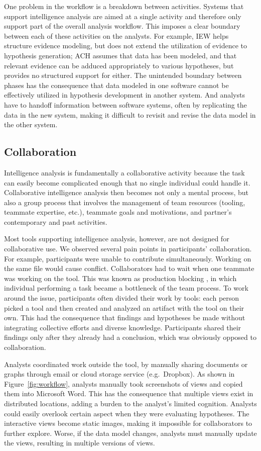 One problem in the workflow is a breakdown between activities. Systems that support intelligence analysis are aimed at a single activity and therefore only support part of the overall analysis workflow. This imposes a clear boundary between each of these activities on the analysts. For example, IEW helps structure evidence modeling, but does not extend the utilization of evidence to hypothesis generation; ACH assumes that data has been modeled, and that relevant evidence can be adduced appropriately to various hypotheses, but provides no structured support for either. The unintended boundary between phases has the consequence that data modeled in one software cannot be effectively utilized in hypothesis development in another system. And analysts have to handoff information between software systems, often by replicating the data in the new system, making it difficult to revisit and revise the data model in the other system.


\subsection{Collaboration}

Intelligence analysis is fundamentally a collaborative activity because the task can easily become complicated enough that no single individual could handle it. Collaborative intelligence analysis then becomes not only a mental process, but also a group process that involves the management of team resources (tooling, teammate expertise, etc.), teammate goals and motivations, and partner's contemporary and past activities.

Most tools supporting intelligence analysis, however, are not designed for collaborative use. We observed several pain points in participants’ collaboration. For example, participants were unable to contribute simultaneously. Working on the same file would cause conflict. Collaborators had to wait when one teammate was working on the tool. This was known as production blocking \citep{Diehl1987a}, in which individual performing a task became a bottleneck of the team process. To work around the issue, participants often divided their work by tools: each person picked a tool and then created and analyzed an artifact with the tool on their own. This had the consequence that findings and hypotheses be made without integrating collective efforts and diverse knowledge. Participants shared their findings only after they already had a conclusion, which was obviously opposed to collaboration.

Analysts coordinated work outside the tool, by manually sharing documents or graphs through email or cloud storage service (e.g.~Dropbox). As shown in Figure~\ref{fig:workflow}, analysts manually took screenshots of views and copied them into Microsoft Word. This has the consequence that multiple views exist in distributed locations, adding a burden to the analyst’s limited cognition. Analysts could easily overlook certain aspect when they were evaluating hypotheses. The interactive views become static images, making it impossible for collaborators to further explore. Worse, if the data model changes, analysts must manually update the views, resulting in multiple versions of views.